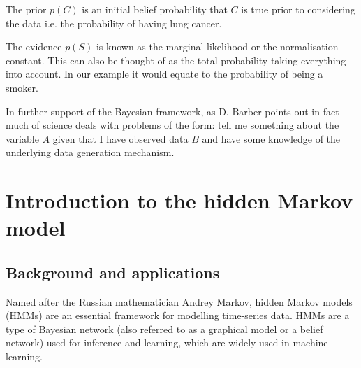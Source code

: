 The prior $p\left( C \right)$ is an initial belief probability that $C$ is true prior to considering the data i.e. the probability of having lung cancer.

The evidence $p\left( S \right)$ is known as the marginal likelihood or the normalisation constant. This can also be thought of as the total probability taking everything into account. In our example it would equate to the probability of being a smoker.

In further support of the Bayesian framework, as D. Barber \autocite{barberBRML2012} points out in fact much of science deals with problems of the form: tell me something about the variable $A$ given that I have observed data $B$ and have some knowledge of the underlying data generation mechanism.


\section{Introduction to the hidden Markov model}

\subsection{Background and applications}
Named after the Russian mathematician Andrey Markov, hidden Markov models (HMMs) are an essential framework for modelling time-series data. HMMs are a type of Bayesian network (also referred to as a graphical model or a belief network) used for inference and learning, which are widely used in machine learning.

